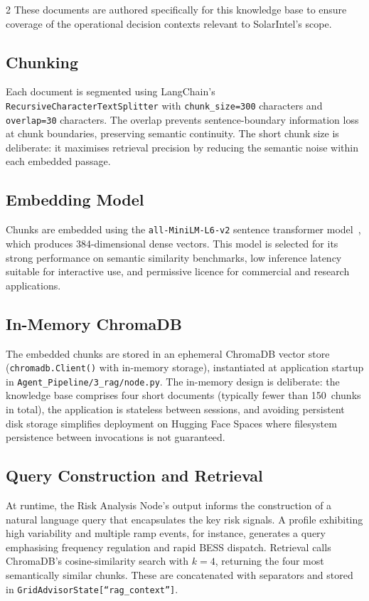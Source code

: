 \documentclass[11pt]{article}
\begin{document}
\begin{multicols}{2}
These documents are authored specifically for this knowledge base to ensure
coverage of the operational decision contexts relevant to SolarIntel's scope.

\subsection{Chunking}

Each document is segmented using LangChain's
\texttt{RecursiveCharacterTextSplitter} with \texttt{chunk\_size=300} characters
and \texttt{overlap=30} characters. The overlap prevents sentence-boundary
information loss at chunk boundaries, preserving semantic continuity. The short
chunk size is deliberate: it maximises retrieval precision by reducing the
semantic noise within each embedded passage.

\subsection{Embedding Model}

Chunks are embedded using the \texttt{all-MiniLM-L6-v2} sentence transformer
model~\cite{reimers2019}, which produces 384-dimensional dense vectors. This
model is selected for its strong performance on semantic similarity benchmarks,
low inference latency suitable for interactive use, and permissive licence
for commercial and research applications.

\subsection{In-Memory ChromaDB}

The embedded chunks are stored in an ephemeral ChromaDB vector store
(\texttt{chromadb.Client()} with in-memory storage), instantiated at
application startup in \texttt{Agent\_Pipeline/3\_rag/node.py}. The in-memory
design is deliberate: the knowledge base comprises four short documents
(typically fewer than 150~chunks in total), the application is stateless
between sessions, and avoiding persistent disk storage simplifies deployment
on Hugging Face Spaces where filesystem persistence between invocations is
not guaranteed.

\subsection{Query Construction and Retrieval}

At runtime, the Risk Analysis Node's output informs the construction of a
natural language query that encapsulates the key risk signals. A profile
exhibiting high variability and multiple ramp events, for instance, generates a
query emphasising frequency regulation and rapid BESS dispatch. Retrieval
calls ChromaDB's cosine-similarity search with $k=4$, returning the four most
semantically similar chunks. These are concatenated with separators and stored
in \texttt{GridAdvisorState[``rag\_context'']}.


\end{multicols}
\end{document}
